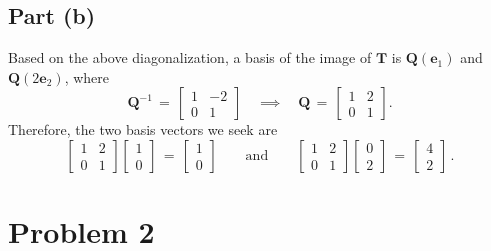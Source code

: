\documentclass[11pt]{article}
\renewcommand{\vec}[1]{\mathbf{#1}}
\newcommand{\mat}[1]{\mathbf{#1}}
\begin{document}
\subsection{Part (b)}

Based on the above diagonalization, a basis of the image of $\mat{T}$ is $\mat{Q}(\vec{e}_{1})$ and $\mat{Q}(2 \vec{e}_{2})$, where
\[
  \mat{Q}^{-1} \, = \,  \begin{bmatrix} 1 & -2 \\ 0 & 1 \end{bmatrix} \quad \implies \quad \mat{Q} \, = \, \begin{bmatrix} 1 & 2 \\ 0 & 1 \end{bmatrix}.
\]
Therefore, the two basis vectors we seek are
\[
  \begin{bmatrix} 1 & 2 \\ 0 & 1 \end{bmatrix} \begin{bmatrix} 1 \\ 0 \end{bmatrix} \, = \, \boxed{ \begin{bmatrix} 1 \\ 0 \end{bmatrix}} \qquad \text{and} \qquad \begin{bmatrix} 1 & 2 \\ 0 & 1 \end{bmatrix} \begin{bmatrix} 0 \\ 2 \end{bmatrix} \, = \, \boxed{ \begin{bmatrix} 4 \\ 2 \end{bmatrix}}\,.
\]


\section{Problem 2}
\end{document}
